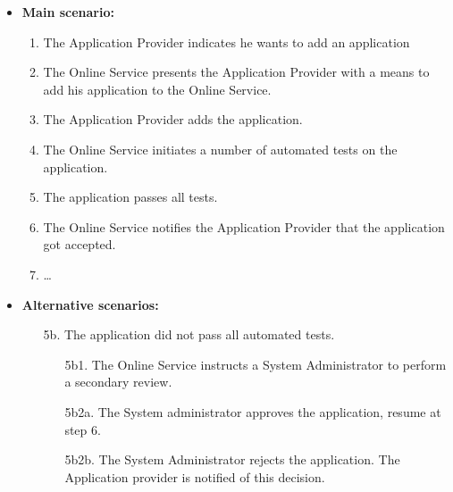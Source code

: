\documentclass[english]{sareport}
\begin{document}
\begin{itemize}
    \item \textbf{Main scenario:} 
    \begin{enumerate}
       \item The Application Provider indicates he wants to add an application
       \item The Online Service presents the Application Provider with a means to add his application to the Online Service.
       \item The Application Provider adds the application.
	\item The Online Service initiates a number of automated tests on the application.
	\item The application passes all tests.
	\item The Online Service notifies the Application Provider that the application got accepted.
       \item \ldots
    \end{enumerate}

    \item \textbf{Alternative scenarios:} 
    \begin{enumerate}
        \item [5b.] The application did not pass all automated tests.
	\begin{enumerate}
		\item [5b1.] The Online Service instructs a System Administrator to perform a secondary review.
		\item [5b2a.] The System administrator approves the application, resume at step 6.
		\item [5b2b.] The System Administrator rejects the application. The Application provider is notified of this decision.
	\end{enumerate}
    \end{enumerate}
\end{itemize}
\end{document}
